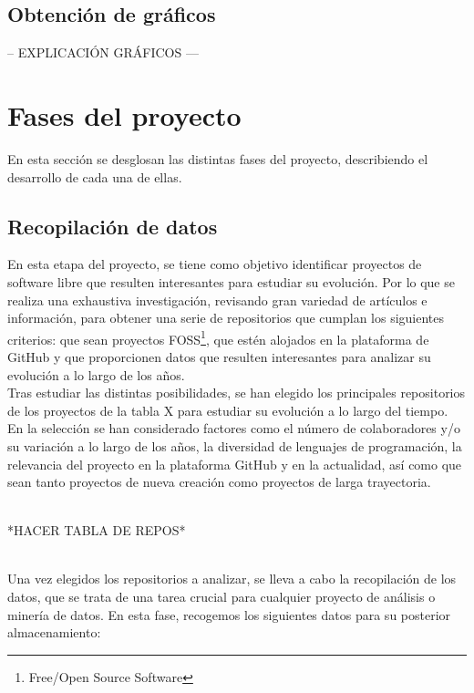 \documentclass[a4paper, 12pt]{book}
\begin{document}
\subsection{Obtención de gráficos}
\label{subsec:programa-graficos}

-- EXPLICACIÓN GRÁFICOS ---

\section{Fases del proyecto} 
\label{sec:fases-proyecto}

En esta sección se desglosan las distintas fases del proyecto, describiendo el desarrollo de cada una de ellas.

\subsection{Recopilación de datos}
\label{subsec:recopilacion}

En esta etapa del proyecto, se tiene como objetivo identificar proyectos de software libre que resulten interesantes para estudiar su evolución. Por lo que se realiza una exhaustiva investigación, revisando gran variedad de artículos e
información, para obtener una serie de repositorios que cumplan los siguientes criterios: que sean proyectos FOSS\footnote{Free/Open Source Software}, que estén alojados en la plataforma de GitHub y que proporcionen datos que resulten interesantes
para analizar su evolución a lo largo de los años.
\\Tras estudiar las distintas posibilidades, se han elegido los principales repositorios de los proyectos de la tabla X para estudiar su evolución a lo largo del tiempo. En la selección se han considerado factores como el número de colaboradores y/o
su variación a lo largo de los años, la diversidad de lenguajes de programación, la relevancia del proyecto en la plataforma GitHub y en la actualidad, así como que sean tanto proyectos de nueva creación como proyectos de larga trayectoria.

\\*HACER TABLA DE REPOS*

\\Una vez elegidos los repositorios a analizar, se lleva a cabo la recopilación de los datos, que se trata de una tarea crucial para cualquier proyecto de análisis o minería de datos. En esta fase, recogemos los siguientes datos para su posterior 
almacenamiento:
\end{document}
